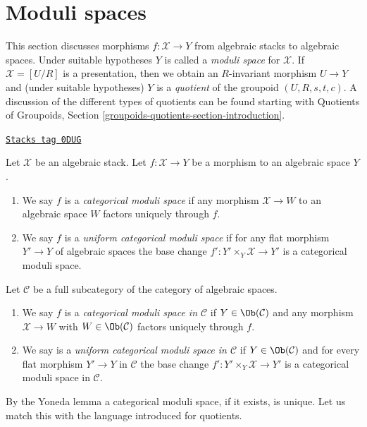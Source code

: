 \section{Moduli spaces}
\label{stacks-more-morphisms-section-moduli-spaces}
This section discusses morphisms $f : \mathcal{X} \to Y$ from
algebraic stacks to algebraic spaces. Under suitable hypotheses
$Y$ is called a {\it moduli space} for $\mathcal{X}$. If
$\mathcal{X} = [U/R]$ is a presentation, then we obtain an
$R$-invariant morphism $U \to Y$ and (under suitable hypotheses)
$Y$ is a {\it quotient} of the groupoid $(U, R, s, t, c)$.
A discussion of the different types of quotients can be found
starting with
Quotients of Groupoids, Section \ref{groupoids-quotients-section-introduction}.

\begin{definition}
\label{stacks-more-morphisms-definition-categorical-quotient}
\href{https://stacks.math.columbia.edu/tag/0DUG}{\texttt{Stacks tag 0DUG}}

Let $\mathcal{X}$ be an algebraic stack. Let
$f : \mathcal{X} \to Y$ be a morphism to an algebraic space $Y$.
\begin{enumerate}
\item We say $f$ is a {\it categorical moduli space} if any morphism
$\mathcal{X} \to W$ to an algebraic space $W$ factors uniquely through $f$.
\item We say $f$ is a {\it uniform categorical moduli space}
if for any flat morphism $Y' \to Y$ of algebraic spaces the base change
$f' : Y' \times_Y \mathcal{X} \to Y'$ is a categorical moduli space.
\end{enumerate}
Let $\mathcal{C}$ be a full subcategory of the category of algebraic
spaces.
\begin{enumerate}
\item[(3)] We say $f$ is a {\it categorical moduli space in $\mathcal{C}$}
if $Y \in \Ob(\mathcal{C})$ and any morphism $\mathcal{X} \to W$ with
$W \in \Ob(\mathcal{C})$ factors uniquely through $f$.
\item[(4)] We say is a {\it uniform categorical moduli space in $\mathcal{C}$}
if $Y \in \Ob(\mathcal{C})$ and for every flat morphism $Y' \to Y$ in
$\mathcal{C}$ the base change $f' : Y' \times_Y \mathcal{X} \to Y'$ is a
categorical moduli space in $\mathcal{C}$.
\end{enumerate}
\end{definition}

By the Yoneda lemma a categorical moduli space, if it exists, is unique.
Let us match this with the language introduced for quotients.

